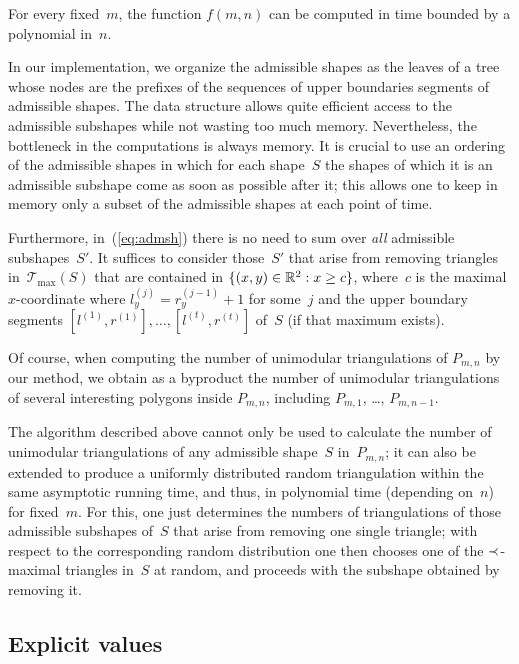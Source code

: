 \begin{theorem}
  For every fixed~$m$, the function $f(m,n)$ can be computed in time
  bounded by a polynomial in~$n$.
\end{theorem}

In our implementation, we organize the admissible shapes as the leaves
of a tree whose nodes are the prefixes of the sequences of upper
boundaries segments of admissible shapes. The data structure allows
quite efficient access to the admissible subshapes while not wasting
too much memory.  Nevertheless, the bottleneck in the computations
is always memory. It is crucial to use an ordering of the
admissible shapes in which for each shape~$S$ the shapes of which it
is an admissible subshape come as soon as possible after it; this
allows one to keep in memory only a subset of the admissible shapes at
each point of time.

Furthermore, in~(\ref{eq:admsh}) there is no need to sum over \emph{all}
admissible subshapes~$S'$. It suffices to consider those~$S'$ that
arise from removing triangles in~$\mathcal{T}_{\max}(S)$ that are
contained in $\{(x,y)\in\mathbb{R}^2:x\geq c\}$, where~$c$
is the maximal $x$-coordinate where $l^{(j)}_y=r^{(j-1)}_y+1$ for
some~$j$ and the upper boundary segments
$[l^{(1)},r^{(1)}],\dots,[l^{(t)},r^{(t)}]$ of~$S$ (if that maximum exists). 

Of course, when computing the number of unimodular triangulations of
$P_{m,n}$ by our method, we obtain as a byproduct the number of
unimodular triangulations of several interesting polygons inside
$P_{m,n}$, including $P_{m,1}$, \dots, $P_{m,n-1}$. 

The algorithm described above cannot only be used to calculate the
number of unimodular triangulations of any admissible shape~$S$
in~$P_{m,n}$; it can also be extended to produce a uniformly
distributed random triangulation within the same
asymptotic running time, and thus, in polynomial time (depending
on~$n$) for fixed~$m$. For this, one just determines the numbers of
triangulations of those admissible subshapes of~$S$ that arise from
removing one single triangle; with respect to the corresponding random
distribution one then chooses one of the $\prec$-maximal triangles
in~$S$ at random, and proceeds with the subshape obtained by removing
it.



\subsection{Explicit values}
\label{subsec:explval}

